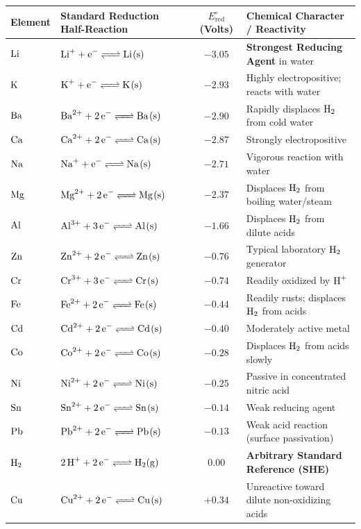 \begin{table}[htbp]
\centering
\small
\renewcommand{\arraystretch}{1.25}
\begin{tabularx}{\textwidth}{l X c p{4.2cm}}
\toprule
\textbf{Element} & \textbf{Standard Reduction Half-Reaction} & \textbf{$E^\circ_{\text{red}}$ (Volts)} & \textbf{Chemical Character / Reactivity} \\
\midrule
$\ce{Li}$ & $\ce{Li+ + e^- <=> Li(s)}$ & $-3.05$ & \textbf{Strongest Reducing Agent} in water \\
$\ce{K}$ & $\ce{K+ + e^- <=> K(s)}$ & $-2.93$ & Highly electropositive; reacts with water \\
$\ce{Ba}$ & $\ce{Ba^2+ + 2e^- <=> Ba(s)}$ & $-2.90$ & Rapidly displaces $\ce{H2}$ from cold water \\
$\ce{Ca}$ & $\ce{Ca^2+ + 2e^- <=> Ca(s)}$ & $-2.87$ & Strongly electropositive \\
$\ce{Na}$ & $\ce{Na+ + e^- <=> Na(s)}$ & $-2.71$ & Vigorous reaction with water \\
$\ce{Mg}$ & $\ce{Mg^2+ + 2e^- <=> Mg(s)}$ & $-2.37$ & Displaces $\ce{H2}$ from boiling water/steam \\
$\ce{Al}$ & $\ce{Al^3+ + 3e^- <=> Al(s)}$ & $-1.66$ & Displaces $\ce{H2}$ from dilute acids \\
$\ce{Zn}$ & $\ce{Zn^2+ + 2e^- <=> Zn(s)}$ & $-0.76$ & Typical laboratory $\ce{H2}$ generator \\
$\ce{Cr}$ & $\ce{Cr^3+ + 3e^- <=> Cr(s)}$ & $-0.74$ & Readily oxidized by $\ce{H+}$ \\
$\ce{Fe}$ & $\ce{Fe^2+ + 2e^- <=> Fe(s)}$ & $-0.44$ & Readily rusts; displaces $\ce{H2}$ from acids \\
$\ce{Cd}$ & $\ce{Cd^2+ + 2e^- <=> Cd(s)}$ & $-0.40$ & Moderately active metal \\
$\ce{Co}$ & $\ce{Co^2+ + 2e^- <=> Co(s)}$ & $-0.28$ & Displaces $\ce{H2}$ from acids slowly \\
$\ce{Ni}$ & $\ce{Ni^2+ + 2e^- <=> Ni(s)}$ & $-0.25$ & Passive in concentrated nitric acid \\
$\ce{Sn}$ & $\ce{Sn^2+ + 2e^- <=> Sn(s)}$ & $-0.14$ & Weak reducing agent \\
$\ce{Pb}$ & $\ce{Pb^2+ + 2e^- <=> Pb(s)}$ & $-0.13$ & Weak acid reaction (surface passivation) \\
\midrule
\textbf{$\ce{H2}$} & \textbf{$\ce{2H+ + 2e^- <=> H2(g)}$} & \textbf{$0.00$} & \textbf{Arbitrary Standard Reference (SHE)} \\
\midrule
$\ce{Cu}$ & $\ce{Cu^2+ + 2e^- <=> Cu(s)}$ & $+0.34$ & Unreactive toward dilute non-oxidizing acids \\

\end{tabularx}
\end{table}

